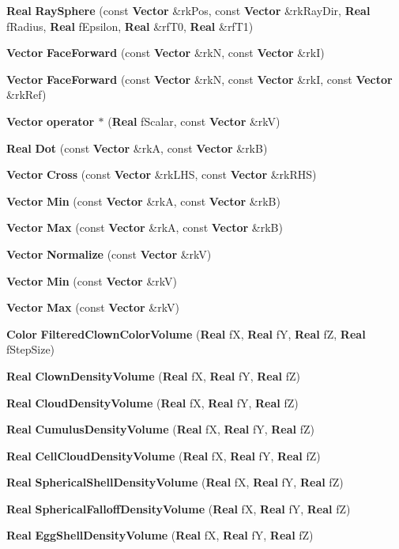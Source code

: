 \begin{CompactItemize}
\item 
{\bf Real} {\bf Ray\-Sphere} (const {\bf Vector} \&rk\-Pos, const {\bf Vector} \&rk\-Ray\-Dir, {\bf Real} f\-Radius, {\bf Real} f\-Epsilon, {\bf Real} \&rf\-T0, {\bf Real} \&rf\-T1)
\item 
{\bf Vector} {\bf Face\-Forward} (const {\bf Vector} \&rk\-N, const {\bf Vector} \&rk\-I)
\item 
{\bf Vector} {\bf Face\-Forward} (const {\bf Vector} \&rk\-N, const {\bf Vector} \&rk\-I, const {\bf Vector} \&rk\-Ref)
\item 
{\bf Vector} {\bf operator $\ast$} ({\bf Real} f\-Scalar, const {\bf Vector} \&rk\-V)
\item 
{\bf Real} {\bf Dot} (const {\bf Vector} \&rk\-A, const {\bf Vector} \&rk\-B)
\item 
{\bf Vector} {\bf Cross} (const {\bf Vector} \&rk\-LHS, const {\bf Vector} \&rk\-RHS)
\item 
{\bf Vector} {\bf Min} (const {\bf Vector} \&rk\-A, const {\bf Vector} \&rk\-B)
\item 
{\bf Vector} {\bf Max} (const {\bf Vector} \&rk\-A, const {\bf Vector} \&rk\-B)
\item 
{\bf Vector} {\bf Normalize} (const {\bf Vector} \&rk\-V)
\item 
{\bf Vector} {\bf Min} (const {\bf Vector} \&rk\-V)
\item 
{\bf Vector} {\bf Max} (const {\bf Vector} \&rk\-V)
\item 
{\bf Color} {\bf Filtered\-Clown\-Color\-Volume} ({\bf Real} f\-X, {\bf Real} f\-Y, {\bf Real} f\-Z, {\bf Real} f\-Step\-Size)
\item 
{\bf Real} {\bf Clown\-Density\-Volume} ({\bf Real} f\-X, {\bf Real} f\-Y, {\bf Real} f\-Z)
\item 
{\bf Real} {\bf Cloud\-Density\-Volume} ({\bf Real} f\-X, {\bf Real} f\-Y, {\bf Real} f\-Z)
\item 
{\bf Real} {\bf Cumulus\-Density\-Volume} ({\bf Real} f\-X, {\bf Real} f\-Y, {\bf Real} f\-Z)
\item 
{\bf Real} {\bf Cell\-Cloud\-Density\-Volume} ({\bf Real} f\-X, {\bf Real} f\-Y, {\bf Real} f\-Z)
\item 
{\bf Real} {\bf Spherical\-Shell\-Density\-Volume} ({\bf Real} f\-X, {\bf Real} f\-Y, {\bf Real} f\-Z)
\item 
{\bf Real} {\bf Spherical\-Falloff\-Density\-Volume} ({\bf Real} f\-X, {\bf Real} f\-Y, {\bf Real} f\-Z)
\item 
{\bf Real} {\bf Egg\-Shell\-Density\-Volume} ({\bf Real} f\-X, {\bf Real} f\-Y, {\bf Real} f\-Z)

\end{CompactItemize}

